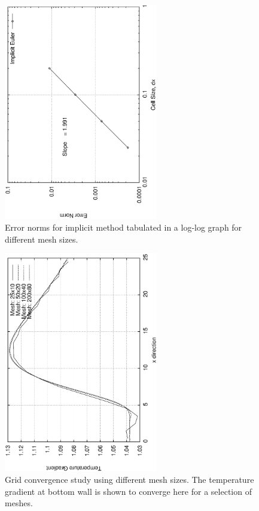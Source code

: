 \documentclass[a4paper,10pt]{article}
\begin{document}
\begin{enumerate}[I]
\begin{figure}
  \centering
  \includegraphics[width=0.6\textwidth, angle = -90]{../plots/order/ieOrder.eps}
  \caption{Error norms for implicit method tabulated in a log-log graph for different mesh sizes.}                
  \label{ieOrder}
\end{figure}

\begin{figure}
  \centering
  \includegraphics[width=0.6\textwidth, angle = -90]{../plots/grid/grid.eps}
  \caption{Grid convergence study using different mesh sizes. The temperature gradient at bottom wall is shown to converge here for a selection of meshes.}                
  \label{grid}
\end{figure}


\end{enumerate}
\end{document}
